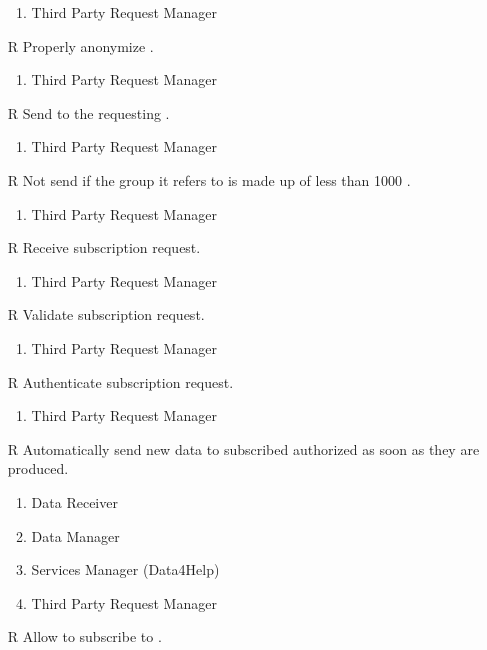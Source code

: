 \begin{itemize}
\begin{enumerate}
		\item Third Party Request Manager
	\end{enumerate}
	\item[R\subs{23}]Properly anonymize .
	\begin{enumerate}
		\item Third Party Request Manager
	\end{enumerate}
	\item[R\subs{24}]Send  to the requesting .
	\begin{enumerate}
		\item Third Party Request Manager
	\end{enumerate}
	\item[R\subs{25}]Not send  if the group it refers to is made up of less than 1000 .
	\begin{enumerate}
		\item Third Party Request Manager
	\end{enumerate}
	\item[R\subs{26}]Receive  subscription request.
	\begin{enumerate}
		\item Third Party Request Manager
	\end{enumerate}
	\item[R\subs{27}]Validate  subscription request.
	\begin{enumerate}
		\item Third Party Request Manager
	\end{enumerate}
	\item[R\subs{28}]Authenticate  subscription request.
	\begin{enumerate}
		\item Third Party Request Manager
	\end{enumerate}
	\item[R\subs{29}]Automatically send new data to subscribed authorized  as soon as they are produced.
	\begin{enumerate}
		\item Data Receiver
		\item Data Manager
		\item Services Manager (Data4Help)
		\item Third Party Request Manager
	\end{enumerate}
	\item[R\subs{30}]Allow  to subscribe to .

\end{itemize}
